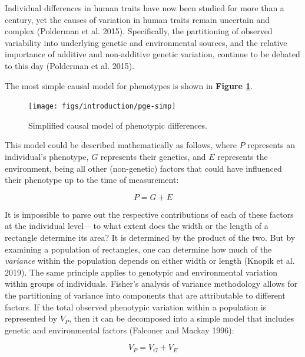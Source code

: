 \documentclass[
]{book}
\begin{document}
Individual differences in human traits have now been studied for more than a century, yet the causes of variation in human traits remain uncertain and complex (Polderman et al. 2015). Specifically, the partitioning of observed variability into underlying genetic and environmental sources, and the relative importance of additive and non-additive genetic variation, continue to be debated to this day (Polderman et al. 2015).

The most simple causal model for phenotypes is shown in \textbf{Figure \ref{fig:pge-simp}}.



\begin{figure}

{\centering \texttt{[image: figs/introduction/pge-simp]} 

}

\caption{Simplified causal model of phenotypic differences.}\label{fig:pge-simp}
\end{figure}

This model could be described mathematically as follows, where \(P\) represents an individual's phenotype, \(G\) represents their genetics, and \(E\) represents the environment, being all other (non-genetic) factors that could have influenced their phenotype up to the time of measurement:

\begin{equation}
P = G + E \label{eq:pge-simp}
\end{equation}

It is impossible to parse out the respective contributions of each of these factors at the individual level -- to what extent does the width or the length of a rectangle determine its area? It is determined by the product of the two. But by examining a population of rectangles, one can determine how much of the \emph{variance} within the population depends on either width or length (Knopik et al. 2019). The same principle applies to genotypic and environmental variation within groups of individuals. Fisher's analysis of variance methodology allows for the partitioning of variance into components that are attributable to different factors. If the total observed phenotypic variation within a population is represented by \(V_{P}\), then it can be decomposed into a simple model that includes genetic and environmental factors (Falconer and Mackay 1996):

\begin{equation}
V_{P} = V_{G} + V_{E} \label{eq:pge}
\end{equation}
\end{document}
